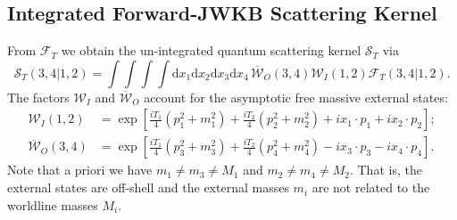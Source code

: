 \subsection{Integrated Forward-JWKB Scattering Kernel}
From $\mathcal{F}_{T}$ we obtain the un-integrated quantum scattering kernel $\mathcal{S}_{T}$ via
\begin{equation}
	\mathcal{S}_{T}(3, 4|1, 2) = \int \int \int \int \mathrm{d}x_{1} \mathrm{d}x_{2} \mathrm{d}x_{3} \mathrm{d}x_{4} \, \overline{\mathcal{W}}_{O}(3, 4) \mathcal{W}_{I}(1, 2) \mathcal{F}_{T}(3, 4|1, 2).
	\label{STTF}
\end{equation}
The factors $\mathcal{W}_{I}$ and $\overline{\mathcal{W}}_{O}$ account for the asymptotic free massive external states:
\begin{align}
	\mathcal{W}_{I}(1, 2) &= \exp{\left[ \frac{i T_{1}}{4} \left( p_{1}^{2} + m_{1}^{2} \right) + \frac{i T_{2}}{4} \left( p_{2}^{2} + m_{2}^{2} \right) + i x_{1} \cdot p_{1} + i x_{2} \cdot p_{2} \right]}; \\
	\overline{\mathcal{W}}_{O}(3, 4) &= \exp{\left[ \frac{i T_{1}}{4} \left( p_{3}^{2} + m_{3}^{2} \right) + \frac{i T_{2}}{4} \left( p_{4}^{2} + m_{4}^{2} \right) - i x_{3} \cdot p_{3} - i x_{4} \cdot p_{4} \right]}.
\end{align}
Note that a priori we have $m_{1} \neq m_{3} \neq M_{1}$ and $m_{2} \neq m_{4} \neq M_{2}$. That is, the external states are off-shell and the external masses $m_{i}$ are not related to the worldline masses $M_{i}$.

